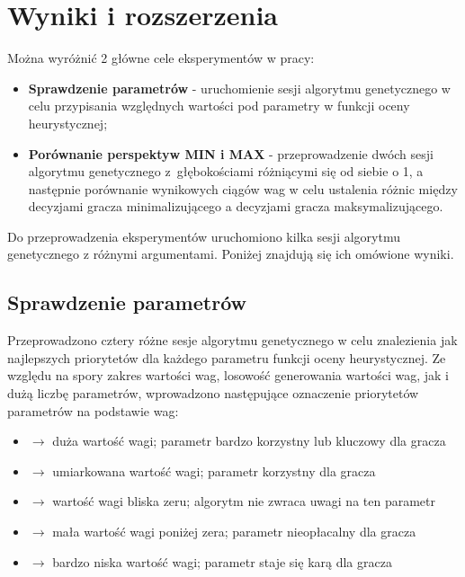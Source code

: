 \chapter{Wyniki i rozszerzenia}
\thispagestyle{chapterBeginStyle}
\label{rozdzial4}

Można wyróżnić 2 główne cele eksperymentów w pracy: 
\begin{itemize}
\item \textbf{Sprawdzenie parametrów} - uruchomienie sesji algorytmu genetycznego w celu przypisania względnych wartości pod parametry w funkcji oceny heurystycznej;
\item \textbf{Porównanie perspektyw MIN i MAX} - przeprowadzenie dwóch sesji algorytmu genetycznego z~głębokościami różniącymi się od siebie o 1, a następnie porównanie wynikowych ciągów wag w celu ustalenia różnic między decyzjami gracza minimalizującego a decyzjami gracza maksymalizującego.
\end{itemize}

Do przeprowadzenia eksperymentów uruchomiono kilka sesji algorytmu genetycznego z różnymi argumentami. Poniżej znajdują się ich omówione wyniki.

\section{Sprawdzenie parametrów}

Przeprowadzono cztery różne sesje algorytmu genetycznego w celu znalezienia jak najlepszych priorytetów dla każdego parametru funkcji oceny heurystycznej. Ze względu na spory zakres wartości wag, losowość generowania wartości wag, jak i dużą liczbę parametrów, wprowadzono następujące oznaczenie priorytetów parametrów na podstawie wag:

\begin{itemize}
    \item \priohp $\rightarrow$ duża wartość wagi; parametr bardzo korzystny lub kluczowy dla gracza
    \item \priomp $\rightarrow$ umiarkowana wartość wagi; parametr korzystny dla gracza
    \item \priol $\rightarrow$ wartość wagi bliska zeru; algorytm nie zwraca uwagi na ten parametr
    \item \priomn $\rightarrow$ mała wartość wagi poniżej zera; parametr nieopłacalny dla gracza
    \item \priohn $\rightarrow$ bardzo niska wartość wagi; parametr staje się karą dla gracza
\end{itemize}

